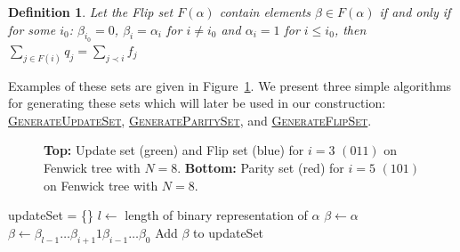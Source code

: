 \documentclass[pdftex,pra,aps,twocolumn,twoside]{revtex4-2}
\newtheorem{definition}{Definition}
\theoremstyle{plain}
\theoremstyle{note}
\newcommand\+{{\footnotesize \raisebox{0.3ex}{+}}}
\begin{document}
\begin{definition} Let the Flip set $F(\alpha)$ contain elements $\beta \in F(\alpha)$ if and only if for some $i_0$: $\beta_{i_0} = 0$, $\beta_i = \alpha_i$ for $i\neq i_0$ and $\alpha_i = 1$ for $i\leq i_0$, then $
 \sum_{j \in F(i)} q_j = \sum_{j \prec i} f_j$
\end{definition}

Examples of these sets are given in Figure~\ref{fenwick_trees}. We present three simple algorithms for generating these sets which will later be used in our construction: \hyperref[GeonerateUpdateSet]{\textsc{GenerateUpdateSet}}, \hyperref[GenerateParitySet]{\textsc{GenerateParitySet}}, and \hyperref[GenerateFlipSet]{\textsc{GenerateFlipSet}}.
\begin{figure}[htbp]
\caption{\label{fenwick_trees} \textbf{Top:}  Update set (green) and Flip set (blue) for $i=3$ $(011)$ on Fenwick tree with $N=8$. \textbf{Bottom:} Parity set (red) for $i=5$ $(101)$ on Fenwick tree with $N=8$.}
\end{figure} \noindent

\begin{algorithm}[htbp]
\caption{\textsc{GenerateUpdateSet}\label{GenerateUpdateSet}}
\begin{algorithmic}[1]
\State updateSet = \{\}
\State $l \gets $ length of binary representation of $\alpha$
\State $\beta \gets \alpha$
        \State $\beta \gets \beta_{l-1}\ldots\beta_{i+1}1\beta_{i-1}\ldots\beta_0$
            \State Add $\beta$ to updateSet
        \EndIf
    \EndIf
\EndFor

\end{algorithmic}
\end{algorithm}
\end{document}
